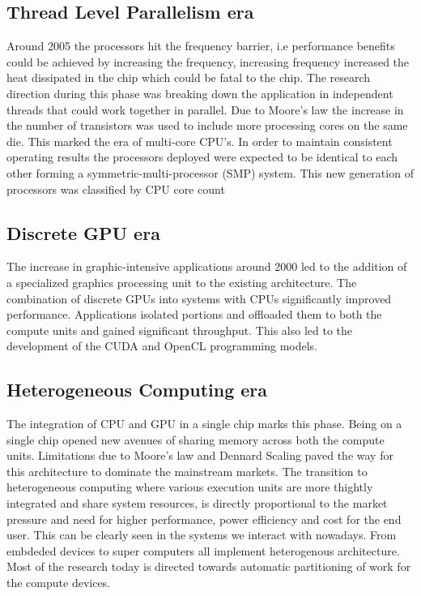 \subsection{Thread Level Parallelism era} Around 2005 the processors hit the
frequency barrier, i.e performance benefits could be achieved by increasing the
frequency, increasing frequency increased the heat dissipated in the chip which
could be fatal to the chip. The research direction during this phase was
breaking down the application in independent threads that could work together
in parallel. Due to Moore's law the increase in the number of transistors was
used to include more processing cores on the same die. This marked the era of
multi-core CPU's. In order to maintain consistent operating results the
processors deployed were expected to be identical to each other forming a
symmetric-multi-processor (SMP) system. This new generation of processors was
classified by CPU core count

\subsection{Discrete GPU era} The increase in graphic-intensive applications
around 2000 led to the addition of a specialized graphics processing unit to
the existing architecture. The combination of discrete GPUs into systems with
CPUs significantly improved performance. Applications isolated portions and
offloaded them to both the compute units and gained significant throughput.
This also led to the development of the CUDA and OpenCL programming models.

\subsection{Heterogeneous Computing era} The integration of CPU and GPU in a
single chip marks this phase. Being on a single chip opened new avenues of
sharing memory across both the compute units. Limitations due to Moore's law
and Dennard Scaling paved the way for this architecture to dominate the
mainstream markets. The transition to heterogeneous computing where various
execution units are more thightly integrated and share system resources, is
directly proportional to the market pressure and need for higher performance,
power efficiency and cost for the end user. This can be clearly seen in the
systems we interact with nowadays. From embdeded devices to super computers all
implement heterogenous architecture. Most of the research today is directed
towards automatic partitioning of work for the compute devices.


